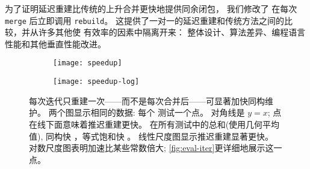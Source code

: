 为了证明延迟重建比传统的上升合并更快地提供同余闭包，
我们修改了 \egg 在每次 \texttt{merge} 后立即调用 \texttt{rebuild}。
这提供了一对一的延迟重建和传统方法之间的比较，并从许多其他使 \egg 有效率的因素中隔离开来：
  整体设计、算法差异、编程语言性能和其他垂直性能改进。

\begin{figure}
  \begin{subfigure}{0.49\linewidth}
    \texttt{[image: speedup]}
  \end{subfigure}
  \hfill
  \begin{subfigure}{0.49\linewidth}
    \texttt{[image: speedup-log]}
  \end{subfigure}
  \caption{
    每次迭代只重建一次——而不是每次合并后——可显著加快同构维护。
    两个图显示相同的数据: 每个 \nEggTests 测试一个点。
    对角线是 $y=x$; 点在线下面意味着推迟重建更快。
    在所有测试中的总和(使用几何平均值), 同构快 \CongrSpeedup，等式饱和快 \TotalSpeedup。
    线性尺度图显示推迟重建显著更快。
    对数尺度图表明加速比某些常数倍大; 
      \autoref{fig:eval-iter}更详细地展示这一点。
  }
  \label{fig:eval}


\end{figure}
